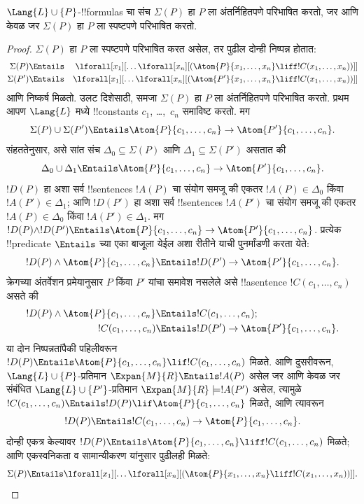\documentclass[../../../include/open-logic-section]{subfiles}
\begin{document}
\begin{thm}[बेथचे परिभाष्यता प्रमेय] $\Lang{L}
  \cup\{P\}$-!!{formula}s चा संच $\Sigma(P)$ हा $P$ ला अंतर्निहितपणे
  परिभाषित करतो, जर आणि केवळ जर $\Sigma(P)$ हा $P$ ला स्पष्टपणे परिभाषित करतो.
\end{thm}

\begin{proof}
$\Sigma(P)$ हा $P$ ला स्पष्टपणे परिभाषित करत असेल, तर पुढील दोन्ही निष्पन्न होतात:
\begin{align*}
  \Sigma(P) & \Entails & \lforall[x_1][\dots \lforall[x_n]
    [(\Atom{P}{x_1,\dots, x_n} \liff !C(x_1,\dots,x_n))]]\\
  \Sigma(P') & \Entails & \lforall[x_1][\dots \lforall[x_n]
    [(\Atom{P'}{x_1,\dots, x_n} \liff !C(x_1,\dots,x_n))]]
\end{align*}
आणि निष्कर्ष मिळतो. उलट दिशेसाठी, समजा $\Sigma(P)$ हा $P$ ला
अंतर्निहितपणे परिभाषित करतो. प्रथम आपण $\Lang{L}$ मध्ये !!{constant}s
$c_1$, \dots,~$c_n$ समाविष्ट करतो. मग
\[
\Sigma(P) \cup \Sigma(P') \Entails
\Atom{P}{c_1, \dots, c_n} \to  \Atom{P'}{c_1, \dots, c_n}.
\]
संहततेनुसार, असे सांत संच $\Delta_0 \subseteq \Sigma(P)$ आणि
$\Delta_1 \subseteq \Sigma(P')$ असतात की
\[
\Delta_0 \cup \Delta_1 \Entails
\Atom{P}{c_1, \dots, c_n} \to \Atom{P'}{c_1, \dots, c_n}.
\]
$!D(P)$ हा अशा सर्व !!{sentence}s $!A(P)$ चा संयोग समजू की एकतर
$!A(P) \in \Delta_0$ किंवा $!A(P') \in \Delta_1$; आणि $!D(P')$ हा अशा
सर्व !!{sentence}s $!A(P')$ चा संयोग समजू की एकतर $!A(P) \in \Delta_0$
किंवा $!A(P') \in \Delta_1$. मग $!D(P) \land
!D(P') \Entails \Atom{P}{c_1, \dots, c_n} \to \Atom{P'}{c_1, \dots, c_n}$.
प्रत्येक !!{predicate} $\Entails$ च्या एका बाजूला येईल अशा रीतीने याची
पुनर्मांडणी करता येते:
\[
!D(P) \land \Atom{P}{c_1, \dots, c_n} \Entails
!D(P') \to \Atom{P'}{c_1, \dots, c_n}.
\]
क्रेगच्या अंतर्वेशन प्रमेयानुसार $P$ किंवा $P'$ यांचा समावेश नसलेले असे
!!a{sentence} $!C(c_1,\dots, c_n)$ असते की
\begin{align*}
  !D(P) \land \Atom{P}{c_1, \dots, c_n} & \Entails !C(c_1,\dots, c_n); \\
  !C(c_1,\dots, c_n) & \Entails !D(P') \to \Atom{P'}{c_1, \dots, c_n}.
\end{align*}
या दोन निष्पन्नतांपैकी पहिलीवरून $!D(P) \Entails
\Atom{P}{c_1,\dots, c_n} \lif !C(c_1,\dots, c_n)$ मिळते. आणि दुसरीवरून,
$\Lang{L} \cup \{P\}$-प्रतिमान $\Expan{M}{R} \Entails !A(P)$ असेल जर
आणि केवळ जर संबंधित $\Lang{L} \cup \{P'\}$-प्रतिमान
$\Expan{M}{R} \models !A(P')$ असेल, त्यामुळे
$!C(c_1,\dots, c_n) \Entails !D(P) \lif \Atom{P}{c_1,\dots, c_n}$ मिळते,
आणि त्यावरून
\[
!D(P) \Entails !C(c_1,\dots,c_n) \to \Atom{P}{c_1,\dots, c_n}.
\]
दोन्ही एकत्र केल्यावर $!D(P) \Entails \Atom{P}{c_1,\dots, c_n}
\liff !C(c_1, \dots, c_n)$ मिळते; आणि एकस्वनिकता व सामान्यीकरण यांनुसार पुढीलही मिळते:
\[
\Sigma(P) \Entails
\lforall[x_1][\dots\lforall[x_n][(\Atom{P}{x_1,\dots, x_n} \liff
    !C(x_1,\dots, x_n))]].
\]
\end{proof}
\end{document}
